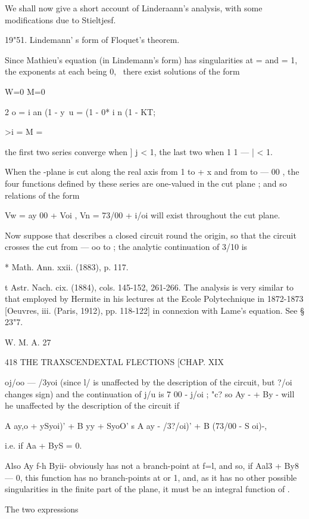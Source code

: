 We shall now give a short account of Linderaann's analysis, with some 
modifications due to Stieltjesf. 

19"51. Lindemann' s form of Floquet's theorem. 

Since Mathieu's equation (in Lindemann's form) has singularities at  = 
and  = 1, the exponents at each being 0, \, there exist solutions of the form 

W=0 M=0 

2 o = i an (1 -  y\  u = (1 - 0* i  n (1 - KT; 

>i = M = 

the first two series converge when ]  j < 1, the last two when 1 1 —  | < 1. 

When the  -plane is cut along the real axis from 1 to + x and from 
to — 00 , the four functions defined by these series are one-valued in the 
cut plane ; and so relations of the form 

Vw = ay 00 +  Voi , Vn = 73/00 +  i/oi 
will exist throughout the cut plane. 

Now suppose that   describes a closed circuit round the origin, so that the 
circuit crosses the cut from — oo to ; the analytic continuation of 3/10 is 

* Math. Ann. xxii. (1883), p. 117. 

t Astr. Nach. cix. (1884), cols. 145-152, 261-266. The analysis is very similar to that 
employed by Hermite in his lectures at the Ecole Polytechnique in 1872-1873 [Oeuvres, iii. 
(Paris, 1912), pp. 118-122] in connexion with Lame's equation. See § 23"7. 

W. M. A. 27 



418 THE TRAXSCENDEXTAL FLECTIONS [CHAP. XIX 

oj/oo — /3yoi (since l/  is unaffected by the description of the circuit, but ?/oi 
changes sign) and the continuation of j/u is 7 00 -  j/oi ;  "c? so Ay - + By  - will 
he unaffected by the description of the circuit if 

A  ay,o + ySyoi)' + B  yy  + SyoO' s A  ay  - /3?/oi)' + B (73/00 - S oi)-, 

i.e. if Aa + ByS = 0. 

Also Ay f-h Byii- obviously has not a branch-point at f=l, and so, if 
Aal3 + By8 — 0, this function has no branch-points at or 1, and, as it has no 
other possible singularities in the finite part of the plane, it must be an 
integral function of  . 

The two expressions 

